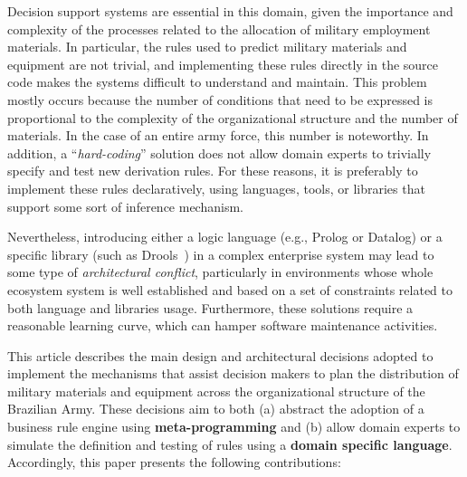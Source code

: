 Decision support systems are essential in this domain, given the importance and complexity of the processes related to the allocation of military employment materials. In particular, the rules used to predict military materials and equipment are not trivial, and implementing these rules directly in the source code makes the systems difficult to understand and maintain. This problem mostly occurs because the number of conditions that need to be expressed is proportional to the complexity of the organizational structure and the number of materials. In the case of an entire army force, this number is noteworthy. In addition, a ``\emph{hard-coding}'' solution does not allow domain experts to trivially specify and test new derivation rules. For these reasons, it is preferably to implement these rules declaratively, using languages, tools, or libraries that support some sort of inference mechanism.


Nevertheless, introducing either a logic language (e.g., Prolog or Datalog) or a specific library (such as  Drools~\cite{browne2009}) in a complex enterprise system may lead to some type of \emph{architectural 
conflict}, particularly in environments whose whole ecosystem system is well established and based on a set of 
constraints related to both language and libraries usage. Furthermore, these solutions require a reasonable learning curve, which can hamper software maintenance activities.


This article describes the main design and architectural decisions adopted to implement the mechanisms that assist 
decision makers to plan the distribution of military materials and equipment across the organizational structure 
of the Brazilian Army. These decisions aim to both (a) abstract the adoption of a business rule engine using {\bf meta-programming} 
and (b) allow domain experts to simulate the definition and testing of rules using 
a {\bf domain specific language}. Accordingly, this paper presents the following contributions:

